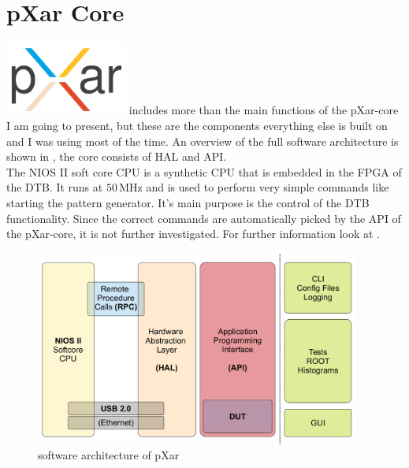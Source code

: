 \documentclass[british,11pt,a4paper]{memoir}
\begin{document}
\section{pXar Core}
\includegraphics[width=4cm]{pxar_logo}
includes more than the main functions of the pXar-core I am going to present, but these are the components everything else is built on and I was using most of the time. An overview of the full software architecture is shown in , the core consists of \ac{HAL} and \ac{API}.\\
The NIOS II soft core \ac{CPU} is a synthetic \ac{CPU} that is embedded in the \ac{FPGA} of the \ac{DTB}. It runs at $50\,$MHz and is used to perform very simple commands like starting the pattern generator. It's main purpose is the control of the \ac{DTB} functionality. Since the correct commands are automatically picked by the \ac{API} of the pXar-core, it is not further investigated. For further information look at \cite{spannagel}.
\begin{figure}[ht]
	\includegraphics[width=0.95\textwidth]{pxar_scheme}
	\caption{software architecture of pXar \cite{spannagel}}
	\label{p13}
\end{figure}
\end{document}
